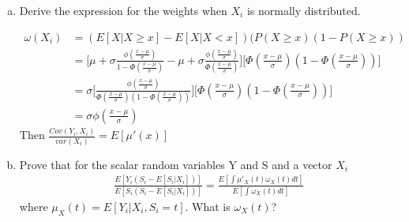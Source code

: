 \documentclass[11pt]{article}
\begin{document}
\begin{enumerate}[a)]
	\item Derive the expression for the weights when $X_i$ is normally distributed.

	\begin{align*}
	\omega(X_i) &= ( E[X | X \geq x] - E[X | X < x] ) (P(X \geq x) ( 1 - P(X \geq x)) \\
	&=\bigg[ \mu + \sigma \frac{\phi (\frac{x - \mu}{\sigma})}{1 - \Phi( \frac{x - \mu}{\sigma})} - \mu + \sigma \frac{\phi (\frac{x - \mu}{\sigma})}{\Phi( \frac{x - \mu}{\sigma})} \bigg] \bigg[\Phi( \frac{x - \mu}{\sigma})(1- \Phi( \frac{x - \mu}{\sigma})) \bigg] \\
	&=\sigma \bigg[\frac{ \phi( \frac{x - \mu}{\sigma}) }{\Phi( \frac{x - \mu}{\sigma})(1- \Phi( \frac{x - \mu}{\sigma}))} \bigg] \bigg[\Phi( \frac{x - \mu}{\sigma})(1- \Phi( \frac{x - \mu}{\sigma}))\bigg] \\
	&=\sigma \phi( \frac{x - \mu}{\sigma})
	\end{align*}
	\medskip
	Then $\frac{Cov(Y_i, X_i)}{var(X_i)} = E[\mu ' (x)]$

	\item Prove that for the scalar random variables Y and S and a vector $X_i$ \\
	\begin{align*}
		\frac{E[Y_i(S_i - E[S_i|X_i])]}{E[S_i(S_i - E[S_i|X_i])]} = \frac{E [\int \mu'_X(t) 		\omega_X(t) dt]}{E[\int \omega_X(t) dt]}
		\end{align*}
	where $\mu_X(t) = E[Y_i|X_i, S_i=t]$. What is $\omega_X(t)$? \\


\end{enumerate}
\end{document}
